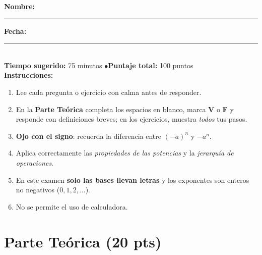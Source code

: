\documentclass[12pt, letterpaper]{article}
\begin{document}


\vspace{4pt}
\begin{cuadroinfo}
  \small
  \textbf{Nombre:} \rule{0.55\linewidth}{0.4pt} \quad \textbf{Fecha:} \rule{0.15\linewidth}{0.4pt} \\[6pt]
  \textbf{Tiempo sugerido:} 75 minutos \quad$\bullet$\quad \textbf{Puntaje total:} 100 puntos \\[4pt]
  \textbf{Instrucciones:}
  \begin{enumerate}[leftmargin=*]
    \item Lee cada pregunta o ejercicio con calma antes de responder.
    \item En la \textbf{Parte Teórica} completa los espacios en blanco, marca \textbf{V} o \textbf{F} y responde con definiciones breves; en los ejercicios, muestra \emph{todos} tus pasos.
    \item \textbf{Ojo con el signo}: recuerda la diferencia entre $(-a)^n$ y $-a^n$.
    \item Aplica correctamente las \emph{propiedades de las potencias} y la \emph{jerarquía de operaciones}.
    \item En este examen \textbf{solo las bases llevan letras} y los exponentes son enteros no negativos ($0, 1, 2, \dots$).
    \item No se permite el uso de calculadora.
  \end{enumerate}
\end{cuadroinfo}

\vspace{8pt}

\section{Parte Teórica (20 pts)}
\end{document}
